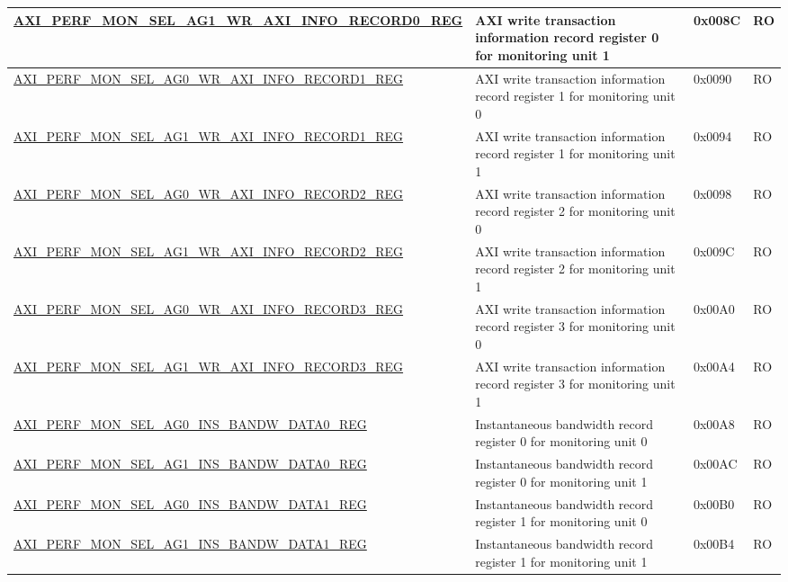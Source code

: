 \begin{longtable}{ | p{9.1cm} | p{5cm} | p{1.3cm} | p{1.4cm} | }
\hyperref[regdesc:AXIPERFMONSELAGNWRAXIINFORECORDMREG]{AXI\_PERF\_MON\_SEL\_AG1\_WR\_AXI\_INFO\_RECORD0\_REG} & AXI write transaction information record register 0 for monitoring unit 1 & 0x008C & RO\\ \hline
\hyperref[regdesc:AXIPERFMONSELAGNWRAXIINFORECORDMREG]{AXI\_PERF\_MON\_SEL\_AG0\_WR\_AXI\_INFO\_RECORD1\_REG} & AXI write transaction information record register 1 for monitoring unit 0 & 0x0090 & RO\\ \hline
\hyperref[regdesc:AXIPERFMONSELAGNWRAXIINFORECORDMREG]{AXI\_PERF\_MON\_SEL\_AG1\_WR\_AXI\_INFO\_RECORD1\_REG} & AXI write transaction information record register 1 for monitoring unit 1 & 0x0094 & RO\\ \hline
\hyperref[regdesc:AXIPERFMONSELAGNWRAXIINFORECORDMREG]{AXI\_PERF\_MON\_SEL\_AG0\_WR\_AXI\_INFO\_RECORD2\_REG} & AXI write transaction information record register 2 for monitoring unit 0 & 0x0098 & RO\\ \hline
\hyperref[regdesc:AXIPERFMONSELAGNWRAXIINFORECORDMREG]{AXI\_PERF\_MON\_SEL\_AG1\_WR\_AXI\_INFO\_RECORD2\_REG} & AXI write transaction information record register 2 for monitoring unit 1 & 0x009C & RO\\ \hline
\hyperref[regdesc:AXIPERFMONSELAGNWRAXIINFORECORDMREG]{AXI\_PERF\_MON\_SEL\_AG0\_WR\_AXI\_INFO\_RECORD3\_REG} & AXI write transaction information record register 3 for monitoring unit 0 & 0x00A0 & RO\\ \hline
\hyperref[regdesc:AXIPERFMONSELAGNWRAXIINFORECORDMREG]{AXI\_PERF\_MON\_SEL\_AG1\_WR\_AXI\_INFO\_RECORD3\_REG} & AXI write transaction information record register 3 for monitoring unit 1 & 0x00A4 & RO\\ \hline
\hyperref[regdesc:AXIPERFMONSELAGNINSBANDWDATAMREG]{AXI\_PERF\_MON\_SEL\_AG0\_INS\_BANDW\_DATA0\_REG} & Instantaneous bandwidth record register 0 for monitoring unit 0 & 0x00A8 & RO\\ \hline
\hyperref[regdesc:AXIPERFMONSELAGNINSBANDWDATAMREG]{AXI\_PERF\_MON\_SEL\_AG1\_INS\_BANDW\_DATA0\_REG} & Instantaneous bandwidth record register 0 for monitoring unit 1 & 0x00AC & RO\\ \hline
\hyperref[regdesc:AXIPERFMONSELAGNINSBANDWDATAMREG]{AXI\_PERF\_MON\_SEL\_AG0\_INS\_BANDW\_DATA1\_REG} & Instantaneous bandwidth record register 1 for monitoring unit 0 & 0x00B0 & RO\\ \hline
\hyperref[regdesc:AXIPERFMONSELAGNINSBANDWDATAMREG]{AXI\_PERF\_MON\_SEL\_AG1\_INS\_BANDW\_DATA1\_REG} & Instantaneous bandwidth record register 1 for monitoring unit 1 & 0x00B4 & RO\\ \hline

\end{longtable}
